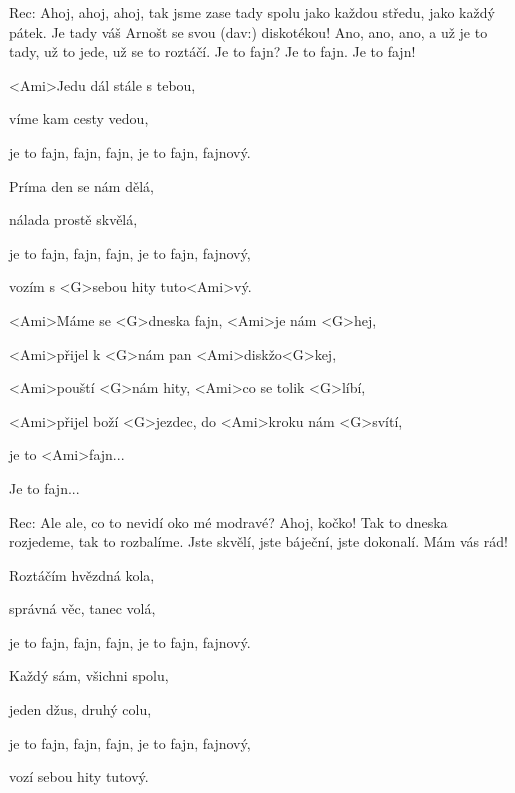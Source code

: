


Rec: Ahoj, ahoj, ahoj, tak jsme zase tady spolu jako každou středu, jako každý pátek. Je tady váš Arnošt se svou (dav:) diskotékou! Ano, ano, ano, a už je to tady, už to jede, už se to roztáčí. Je to fajn? Je to fajn. Je to fajn!




\zs
<Ami>Jedu dál stále s tebou,

víme kam cesty vedou,

je to fajn, fajn, fajn, je to fajn, fajnový.

Príma den se nám dělá,

nálada prostě skvělá,

je to fajn, fajn, fajn, je to fajn, fajnový,

vozím s <G>sebou hity tuto<Ami>vý.
\ks




\zr
<Ami>Máme se <G>dneska fajn, <Ami>je nám <G>hej,

<Ami>přijel k <G>nám pan <Ami>diskžo<G>kej,

<Ami>pouští <G>nám hity, <Ami>co se tolik <G>líbí,

<Ami>přijel boží <G>jezdec, do <Ami>kroku nám <G>svítí,

je to <Ami>fajn...

Je to fajn...
\kr

Rec: Ale ale, co to nevidí oko mé modravé? Ahoj, kočko! Tak to dneska rozjedeme, tak to rozbalíme. Jste skvělí, jste báječní, jste dokonalí. Mám vás rád!


\zs
Roztáčím hvězdná kola,

správná věc, tanec volá,

je to fajn, fajn, fajn, je to fajn, fajnový.

Každý sám, všichni spolu,

jeden džus, druhý colu,

je to fajn, fajn, fajn, je to fajn, fajnový,

vozí sebou hity tutový.
\ks

\zr \kr

\zr \kr

\kp

